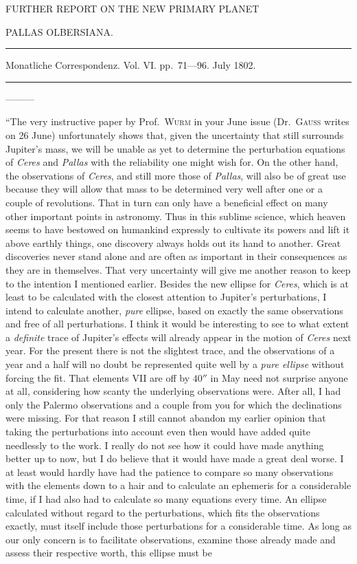 %
\bigskip{}
\begin{center}
{\small FURTHER REPORT ON THE NEW PRIMARY PLANET\par}
PALLAS OLBERSIANA.\par
\medskip\hrule\medskip
Monatliche Correspondenz. Vol. VI. pp.\ 71—96. July 1802.\par
\medskip\hrule
\end{center}\medskip
—\quad —\quad —

“The very instructive paper by Prof.\ \textsc{Wurm} in your June issue (Dr.\ \textsc{Gauss} writes on 26 June) unfortunately shows that, given the uncertainty that still surrounds Jupiter’s mass, we will be unable as yet to determine the perturbation equations of \textit{Ceres} and \textit{Pallas} with the reliability one might wish for. On the other hand, the observations of \textit{Ceres}, and still more those of \textit{Pallas}, will also be of great use because they will allow that mass to be determined very well after one or a couple of revolutions. That in turn can only have a beneficial effect on many other important points in astronomy. Thus in this sublime science, which heaven seems to have bestowed on humankind expressly to cultivate its powers and lift it above earthly things, one discovery always holds out its hand to another. Great discoveries never stand alone and are often as important in their consequences as they are in themselves. That very uncertainty will give me another reason to keep to the intention I mentioned earlier. Besides the new ellipse for \textit{Ceres}, which is at least to be calculated with the closest attention to Jupiter’s perturbations, I intend to calculate another, \textit{pure} ellipse, based on exactly the same observations and free of all perturbations. I think it would be interesting to see to what extent a \textit{definite} trace of Jupiter’s effects will already appear in the motion of \textit{Ceres} next year. For the present there is not the slightest trace, and the observations of a year and a half will no doubt be represented quite well by a \textit{pure ellipse} without forcing the fit. That elements VII are off by $40''$ in May need not surprise anyone at all, considering how scanty the underlying observations were. After all, I had only the Palermo observations and a couple from you for which the declinations were missing. For that reason I still cannot abandon my earlier opinion that taking the perturbations into account even then would have added quite needlessly to the work. I really do not see how it could have made anything better up to now, but I do believe that it would have made a great deal worse. I at least would hardly have had the patience to compare so many observations with the elements down to a hair and to calculate an ephemeris for a considerable time, if I had also had to calculate so many equations every time. An ellipse calculated without regard to the perturbations, which fits the observations exactly, must itself include those perturbations for a considerable time. As long as our only concern is to facilitate observations, examine those already made and assess their respective worth, this ellipse must be 
